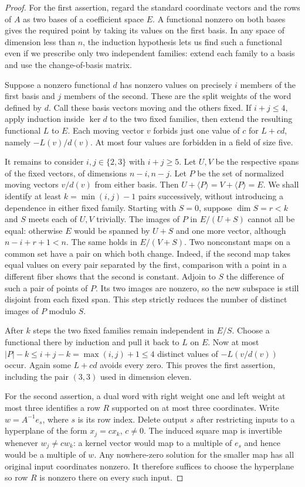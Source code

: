 \begin{proof}
For the first assertion, regard the standard coordinate vectors and the rows of $A$ as two bases of a coefficient space $E$. A functional nonzero on both bases gives the required point by taking its values on the first basis. In any space of dimension less than $n$, the induction hypothesis lets us find such a functional even if we prescribe only two independent families: extend each family to a basis and use the change-of-basis matrix.

Suppose a nonzero functional $d$ has nonzero values on precisely $i$ members of the first basis and $j$ members of the second. These are the split weights of the word defined by $d$. Call these basis vectors moving and the others fixed. If $i+j\le4$, apply induction inside $\ker d$ to the two fixed families, then extend the resulting functional $L$ to $E$. Each moving vector $v$ forbids just one value of $c$ for $L+cd$, namely $-L(v)/d(v)$. At most four values are forbidden in a field of size five.

It remains to consider $i,j\in\{2,3\}$ with $i+j\ge5$. Let $U,V$ be the respective spans of the fixed vectors, of dimensions $n-i,n-j$. Let $P$ be the set of normalized moving vectors $v/d(v)$ from either basis. Then $U+\langle P\rangle=V+\langle P\rangle=E$. We shall identify at least $k=\min(i,j)-1$ pairs successively, without introducing a dependence in either fixed family. Starting with $S=0$, suppose $\dim S=r<k$ and $S$ meets each of $U,V$ trivially. The images of $P$ in $E/(U+S)$ cannot all be equal: otherwise $E$ would be spanned by $U+S$ and one more vector, although $n-i+r+1<n$. The same holds in $E/(V+S)$. Two nonconstant maps on a common set have a pair on which both change. Indeed, if the second map takes equal values on every pair separated by the first, comparison with a point in a different fiber shows that the second is constant. Adjoin to $S$ the difference of such a pair of points of $P$. Its two images are nonzero, so the new subspace is still disjoint from each fixed span. This step strictly reduces the number of distinct images of $P$ modulo $S$.

After $k$ steps the two fixed families remain independent in $E/S$. Choose a functional there by induction and pull it back to $L$ on $E$. Now at most $|P|-k\le i+j-k=\max(i,j)+1\le4$ distinct values of $-L(v/d(v))$ occur. Again some $L+cd$ avoids every zero. This proves the first assertion, including the pair $(3,3)$ used in dimension eleven.

For the second assertion, a dual word with right weight one and left weight at most three identifies a row $R$ supported on at most three coordinates. Write $w=A^{-1}e_s$, where $s$ is its row index. Delete output $s$ after restricting inputs to a hyperplane of the form $x_j=c x_k$, $c\ne0$. The induced square map is invertible whenever $w_j\ne c w_k$: a kernel vector would map to a multiple of $e_s$ and hence would be a multiple of $w$. Any nowhere-zero solution for the smaller map has all original input coordinates nonzero. It therefore suffices to choose the hyperplane so row $R$ is nonzero there on every such input.


\end{proof}
